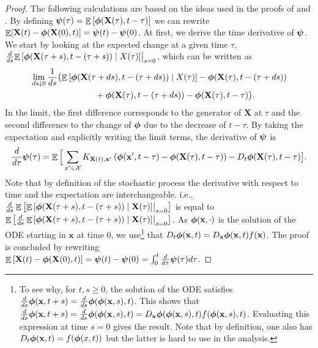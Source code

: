\documentclass[acmsmall]{acmart}
\newcommand\bx{\mathbf{x}}
\newcommand\bX{\mathbf{X}}
\newcommand\bphi{\text{\boldmath$\phi$}}
\newcommand\bpsi{\text{\boldmath$\psi$}}
\newcommand\calX{\mathcal{X}}
\DeclareMathOperator{\E}{\mathbb{E}} %
\newcommand\esp[1]{\E\left[#1\right]} %
\begin{document}
  \begin{proof} \color{myorange}
The following calculations are based on the ideas used in the proofs of \cite[Theorem 1]{kolokoltsovMeanFieldGames2012} and \cite[Theorem 3.1]{gast2017expected}. By defining $\bpsi(\tau) = \esp{\bphi(\bX(\tau),t-\tau)}$ we can rewrite $\E[ \bX(t) - \bphi(\bX(0),t)] = \bpsi(t) - \bpsi(0)$. At first, we derive the time derivative of $\bpsi$. We start by looking at the expected change at a given time $\tau$, $\frac{d}{ds} \bigl. \esp{ \bphi(\bX(\tau + s),t - (\tau + s)) \mid X(\tau)}\bigr|_{s=0}$, which can be written as
\begin{align*}
&  \lim_{ds \downarrow 0} \frac{1}{ds} \bigl( \esp{ \bphi(\bX(\tau + ds),t - (\tau + ds)) \mid X(\tau)} - \bphi(\bX(\tau),t - (\tau + ds))\\
& \phantom{++++++++} + \bphi(\bX(\tau),t - (\tau + ds)) - \bphi(\bX(\tau),t - \tau) \bigr).
\end{align*}
In the limit, the first difference corresponds to the generator of $\bX$ at $\tau$ and the second difference to the change of $\bphi$ due to the decrease of $t-\tau$. By taking the expectation and explicitly writing the limit terms, the derivative of $\bpsi$ is 
\begin{align*}
  \frac{d}{d\tau}\bpsi(\tau) = \E\Big[\sum_{x'\in\calX} K_{\bX(t),\bx'} \left( \bphi(\bx', t-\tau) - \bphi(\bX(\tau),t-\tau) \right) - D_t \bphi(\bX(\tau), t-\tau)\big].
\end{align*}
Note that by definition of the stochastic process the derivative with respect to time and the expectation are interchangeable. i.e., $\frac{d}{ds}\esp{\esp{\bphi(\bX(\tau + s),t-(\tau + s))\mid \bX(\tau)}\bigr|_{s=0}}$ is equal to \\ $\esp{\frac{d}{ds} \esp{\bphi(\bX(\tau + s),t-(\tau + s))\mid \bX(\tau)}\bigr|_{s=0}}$. As $\bphi(\bx,\cdot)$ is the solution of the ODE starting in $\bx$ at time $0$, we use\footnote{To see why, for $t,s\ge0$, the solution of the ODE satisfies $\frac{d}{ds}\bphi(\bx, t+s) = \frac{d}{ds}\bphi(\bphi(\bx,s), t)$. This shows that $\frac{d}{ds}\bphi(\bx, t+s) = \frac{d}{ds}\bphi(\bphi(\bx,s), t) = D_\bx\bphi(\bphi(\bx,s),t)f(\bphi(\bx,s),t)$. Evaluating this expression at time $s=0$ gives the result. Note that by definition, one also has $D_t\bphi(\bx,t)=f(\bphi(x,t))$ but the latter is hard to use in the analysis.} that $D_t\bphi(\bx,t)=D_\bx\bphi(\bx,t)f(\bx)$. The proof is concluded by rewriting\\
  $\esp{\bX(t) - \bphi(\bX(0),t)} = \bpsi(t) - \bpsi(0) = \int_0^t \frac{d}{d\tau}\bpsi(\tau) d\tau$.
\color{black}
\end{proof}
\end{document}
